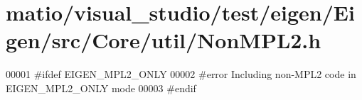 \hypertarget{matio_2visual__studio_2test_2eigen_2_eigen_2src_2_core_2util_2_non_m_p_l2_8h_source}{}\section{matio/visual\+\_\+studio/test/eigen/\+Eigen/src/\+Core/util/\+Non\+M\+P\+L2.h}
\label{matio_2visual__studio_2test_2eigen_2_eigen_2src_2_core_2util_2_non_m_p_l2_8h_source}

\begin{DoxyCode}
00001 \textcolor{preprocessor}{#ifdef EIGEN\_MPL2\_ONLY}
00002 \textcolor{preprocessor}{#error Including non-MPL2 code in EIGEN\_MPL2\_ONLY mode}
00003 \textcolor{preprocessor}{#endif}
\end{DoxyCode}
